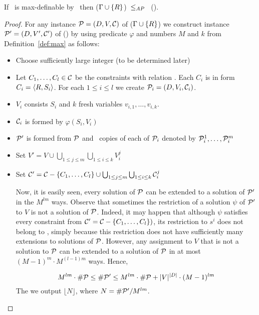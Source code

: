 \begin{theorem}\label{theo:max}
If \mR\ is max-definable by \mrelset\ then \ccsp(\(\Gamma \cup \{{R}\}\))~\(\le_{AP}\)~
\ccsp(\mrelset)\@.
\end{theorem}

\begin{proof}
For any instance \(\mathcal{P} = (D,V,\mathcal{C})\) of  \ccsp(\(\Gamma \cup \{{R}\}\)) we
construct instance \(\mathcal{P}' = (D, V',\mathcal{C}')\) of  \ccsp(\mrelset) by using 
predicate \(\varphi\) and numbers \(M\) and \(k\) from Definition~\ref{def:max} as follows:
\begin{itemize}
\item 
Choose sufficiently large integer \mm(to be determined later)
\item
Let \(C_1,\dotsc,C_l\in\mathcal{C}\) be the constraints with relation \mR\@. Each \(C_i\) is
in form \(C_i=\langle R,S_i \rangle\)\@. For each \(1\le i \le l\) we create \(\mathcal{P}_i=(D,V_i,\mathcal{C}_i)\)\@.
\item \(V_i\) consists \(S_i\) and \(k\) fresh variables \(v_{i,1},\dotsc,v_{i,k}\)\@.
\item \(\mathcal{C}_i\) is formed by \(\varphi(S_i,V_i)\)
\item \(\mathcal{P}'\) is formed from \(\mathcal{P}\) and \mm\ copies of each of \(\mathcal{P}_i\) denoted by
\(\mathcal{P}^1_i,\dotsc,\mathcal{P}^m_i\)
\item Set \(V'=V \cup \bigcup_{1\le j \le m} \bigcup_{1\le i\le k} V^j_i\)
\item Set \(\mathcal{C}' = \mathcal{C} - \{{C_1,\dotsc,C_l}\} \cup 
\bigcup_{1\le j \le m} \bigcup_{1\le i\le k} \mathcal{C}^j_i\)

Now, it is easily seen, every solution of \(\mathcal{P}\) can be extended to a solution of \(\mathcal{P}'\)
in the \(M^{lm}\) ways. Observe that sometimes the restriction of a solution \(\psi\)
of \(\mathcal{P}'\) to \(V\) is not a solution of \(\mathcal{P}\)\@. Indeed, it may happen that
although \(\psi\) satisfies every constraint from \(\mathcal{C}' = \mathcal{C} - \{{C_1,\dotsc,C_l}\})\),
its restriction to \(s^i\) does not belong to \mR, simply because this restriction does not have
sufficiently many extensions to solutions of \(\mathcal{P}\)\@.
However, any assignment to \(V\) that is not a solution to
\(\mathcal{P}\) can be extended to a solution of \(\mathcal{P}\) in at most \((M-1)^m\cdot M^{(l-1)m}\)
ways. Hence, 

\[M^{lm}\cdot \#\mathcal{P} \le  \#\mathcal{P}'  
 \le  M^{lm}	\cdot \#\mathcal{P} + |V|^{|D|} \cdot (M-1)^{lm}
 \]
The we output \(\lfloor N \rfloor\), where \(N=\#\mathcal{P}'/M^{lm}\)\@.


\end{itemize}
\end{proof}
